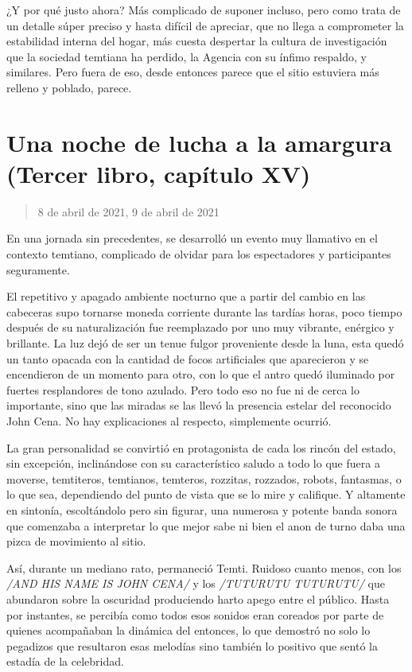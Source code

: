 \documentclass[
]{book}
\begin{document}
¿Y por qué justo ahora? Más complicado de suponer incluso, pero como trata de un detalle súper preciso y hasta difícil de apreciar, que no llega a comprometer la estabilidad interna del hogar, más cuesta despertar la cultura de investigación que la sociedad temtiana ha perdido, la Agencia con su ínfimo respaldo, y similares. Pero fuera de eso, desde entonces parece que el sitio estuviera más relleno y poblado, parece.

\hypertarget{una-noche-de-lucha-a-la-amargura-tercer-libro-capuxedtulo-xv}{%
\section{Una noche de lucha a la amargura (Tercer libro, capítulo XV)}\label{una-noche-de-lucha-a-la-amargura-tercer-libro-capuxedtulo-xv}}

\begin{quote}
8 de abril de 2021, 9 de abril de 2021
\end{quote}

En una jornada sin precedentes, se desarrolló un evento muy llamativo en el contexto temtiano, complicado de olvidar para los espectadores y participantes seguramente.

El repetitivo y apagado ambiente nocturno que a partir del cambio en las cabeceras supo tornarse moneda corriente durante las tardías horas, poco tiempo después de su naturalización fue reemplazado por uno muy vibrante, enérgico y brillante. La luz dejó de ser un tenue fulgor proveniente desde la luna, esta quedó un tanto opacada con la cantidad de focos artificiales que aparecieron y se encendieron de un momento para otro, con lo que el antro quedó iluminado por fuertes resplandores de tono azulado. Pero todo eso no fue ni de cerca lo importante, sino que las miradas se las llevó la presencia estelar del reconocido John Cena. No hay explicaciones al respecto, simplemente ocurrió.

La gran personalidad se convirtió en protagonista de cada los rincón del estado, sin excepción, inclinándose con su característico saludo a todo lo que fuera a moverse, temtiteros, temtianos, temteros, rozzitas, rozzados, robots, fantasmas, o lo que sea, dependiendo del punto de vista que se lo mire y califique. Y altamente en sintonía, escoltándolo pero sin figurar, una numerosa y potente banda sonora que comenzaba a interpretar lo que mejor sabe ni bien el anon de turno daba una pizca de movimiento al sitio.

Así, durante un mediano rato, permaneció Temti. Ruidoso cuanto menos, con los \emph{/AND HIS NAME IS JOHN CENA/} y los \emph{/TUTURUTU TUTURUTU/} que abundaron sobre la oscuridad produciendo harto apego entre el público. Hasta por instantes, se percibía como todos esos sonidos eran coreados por parte de quienes acompañaban la dinámica del entonces, lo que demostró no solo lo pegadizos que resultaron esas melodías sino también lo positivo que sentó la estadía de la celebridad.
\end{document}
